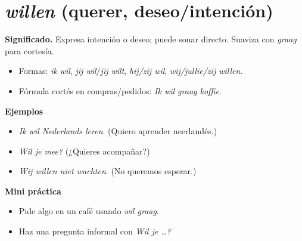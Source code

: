 \section{\textit{willen} (querer, deseo/intención)}
\textbf{Significado.} Expresa intención o deseo; puede sonar directo. Suaviza con \textit{graag} para cortesía.

\begin{itemize}[leftmargin=*]
  \item Formas: \textit{ik wil}, \textit{jij wil}/\textit{jij wilt}, \textit{hij/zij wil}, \textit{wij/jullie/zij willen}.
  \item Fórmula cortés en compras/pedidos: \textit{Ik wil graag koffie}.
\end{itemize}

\textbf{Ejemplos}
\begin{itemize}[leftmargin=*]
  \item \textit{Ik wil Nederlands leren}. (Quiero aprender neerlandés.)
  \item \textit{Wil je mee?} (¿Quieres acompañar?)
  \item \textit{Wij willen niet wachten}. (No queremos esperar.)
\end{itemize}

\textbf{Mini práctica}
\begin{itemize}[leftmargin=*]
  \item Pide algo en un café usando \textit{wil graag}.
  \item Haz una pregunta informal con \textit{Wil je \ldots?}
\end{itemize}
